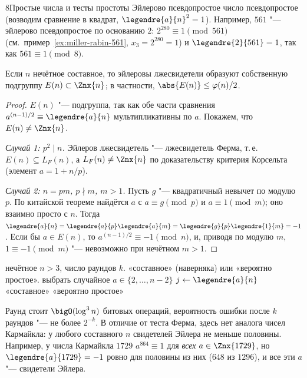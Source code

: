 \begin{lecture}{8}{Простые числа и тесты простоты}
Эйлерово псевдопростое число псевдопростое (возводим сравнение в квадрат, $\legendre{a}{n}^2 = 1$).
Например, $561$ "--- эйлерово псевдопростое по основанию $2$: $2^{280} \equiv 1 \pmod{561}$
(см.\ пример~\ref{ex:miller-rabin-561}, $x_3 = 2^{280} = 1$) и $\legendre{2}{561} = 1$, так как
$561 \equiv 1 \pmod 8$.

\begin{theorem}\label{l8:ss-half}
Если $n$ нечётное составное, то эйлеровы лжесвидетели образуют собственную подгруппу
$E(n) \subset \Znx{n}$; в частности, $\abs{E(n)} \le \varphi(n)/2$.
\end{theorem}

\begin{proof}
$E(n)$ "--- подгруппа, так как обе части сравнения $a^{(n-1)/2} \equiv \legendre{a}{n}$
мультипликативны по $a$. Покажем, что $E(n) \ne \Znx{n}$.

\emph{Случай 1: $p^2 \mid n$.} Эйлеров лжесвидетель "--- лжесвидетель Ферма, т.\,е.
$E(n) \subseteq L_F(n)$, а $L_F(n) \ne \Znx{n}$ по доказательству критерия Корсельта
(элемент $a = 1 + n/p$).

\emph{Случай 2: $n = p m$, $p \nmid m$, $m > 1$.} Пусть $g$ "--- квадратичный невычет по модулю $p$.
По китайской теореме найдётся $a$ с $a \equiv g \pmod p$ и $a \equiv 1 \pmod m$; оно взаимно
просто с $n$. Тогда $\legendre{a}{n} = \legendre{a}{p}\legendre{a}{m} = \legendre{g}{p}\legendre{1}{m} = -1$.
Если бы $a \in E(n)$, то $a^{(n-1)/2} \equiv -1 \pmod n$, и, приводя по модулю $m$,
$1 \equiv -1 \pmod m$ "--- невозможно при нечётном $m > 1$.
\end{proof}

\begin{algorithm}\label{l8:alg-ss}
\begin{algorithmic}[1]
\Require нечётное $n > 3$, число раундов $k$.
\Ensure «составное» (наверняка) или «вероятно простое».
  \State выбрать случайное $a \in \{2, \ldots, n - 2\}$
  \State $j \gets \legendre{a}{n}$ 
   \Return «составное» \EndIf
\EndFor
\State \Return «вероятно простое»
\end{algorithmic}
\end{algorithm}

Раунд стоит $\bigO(\log^3 n)$ битовых операций, вероятность ошибки после $k$ раундов "---
не более $2^{-k}$. В отличие от теста Ферма, здесь нет аналога чисел Кармайкла: у любого
составного $n$ свидетелей Эйлера не меньше половины. Например, у числа Кармайкла $1729$
$a^{864} \equiv 1$ для \emph{всех} $a \in \Znx{1729}$, но $\legendre{a}{1729} = -1$ ровно для
половины из них ($648$ из $1296$), и все эти $a$ "--- свидетели Эйлера.


\end{lecture}
